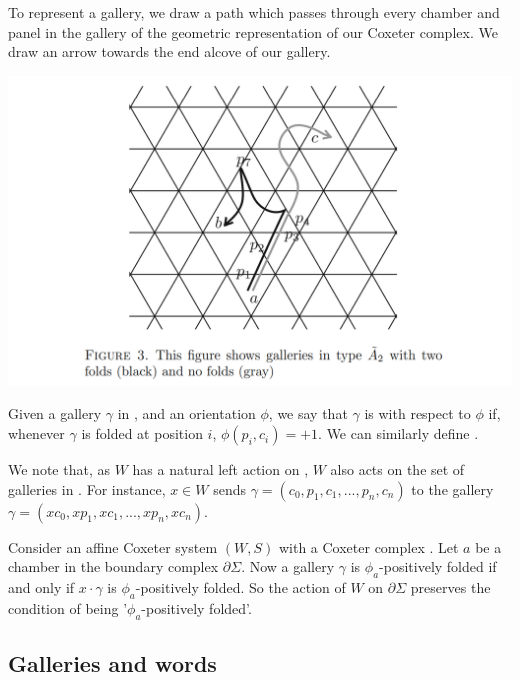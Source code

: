 \documentclass[11pt]{article}
\begin{document}
To represent a gallery, we draw a path which passes through every chamber and panel in the gallery of the geometric representation of our Coxeter complex. We draw an arrow towards the end alcove of our gallery. 

\begin{center}
\includegraphics[scale=0.4]{Screenshot 2023-02-03 111653.png}\\
\end{center}

\begin{definition}
    Given a gallery $\gamma$ in \sg, and an orientation $\phi$, we say that $\gamma$ is  with respect to $\phi$ if, whenever $\gamma$ is folded at position $i$, $\phi(p_i,c_i)=+1$.  We can similarly define .
\end{definition}

We note that, as $W$ has a natural left action on \sg, $W$ also acts on the set of galleries in \sg. For instance, $x\in W$ sends $\gamma = (c_0,p_1,c_1,...,p_n,c_n)$ to the gallery $\gamma = (xc_0,xp_1,xc_1,...,xp_n,xc_n)$. 

\begin{lemma} 
    Consider an affine Coxeter system $(W,S)$ with a Coxeter complex \sg. Let $a$ be a chamber in the boundary complex $\partial\Sigma$. Now a gallery $\gamma$ is $\phi_a$-positively folded if and only if $x\cdot \gamma$ is $\phi_a$-positively folded. So the action of $W$ on $\partial\Sigma$ preserves the condition of being '$\phi_a$-positively folded'.
\end{lemma}

\subsection{Galleries and words}
\end{document}
